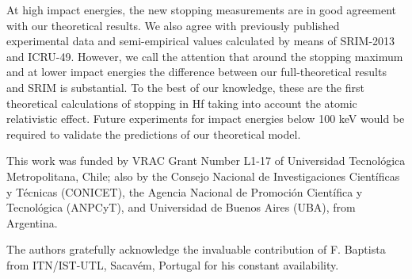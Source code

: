 \documentclass[aps,prb,reprint,groupedaddress]{revtex4-1}
\begin{document}
At high impact energies, the new stopping measurements are in good agreement with our theoretical results. We also agree with previously published experimental data and semi-empirical values calculated by means of SRIM-2013 and ICRU-49.  However, we call the attention that around the stopping maximum and at lower impact energies the difference between our full-theoretical results and SRIM is substantial. To the best of our knowledge, these are the first theoretical calculations of stopping in Hf taking into account the atomic relativistic effect.
Future experiments for impact energies below 100 keV would be required to validate the predictions of our theoretical model.
\begin{acknowledgments}
This work was funded by VRAC Grant Number L1-17 of Universidad Tecnol\'ogica Metropolitana, Chile; also by the Consejo Nacional de Investigaciones Cient\'ificas y T\'ecnicas (CONICET), the Agencia Nacional de Promoci\'on Cient\'ifica y Tecnol\'ogica (ANPCyT), and Universidad de Buenos Aires (UBA), from Argentina.

The authors gratefully acknowledge the invaluable contribution of F. Baptista from ITN/IST-UTL, Sacav\'{e}m, Portugal for his constant availability. 
\end{acknowledgments}
\end{document}
